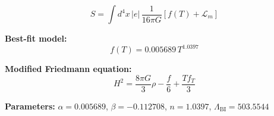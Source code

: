 
\begin{equation}
  S = \int d^4x \, |e| \, \frac{1}{16\pi G} \left[ f(T) + \mathcal{L}_m \right]
\end{equation}

\textbf{Best-fit model:}
\begin{equation}
  f(T) = 0.005689 \, T^{1.0397}
\end{equation}

\textbf{Modified Friedmann equation:}
\begin{equation}
  H^2 = \frac{8\pi G}{3} \rho - \frac{f}{6} + \frac{T f_T}{3}
\end{equation}

\textbf{Parameters:}
$\alpha = 0.005689$, \quad
$\beta = -0.112708$, \quad
$n = 1.0397$, \quad
$\Lambda_{\text{BI}} = 503.5544$